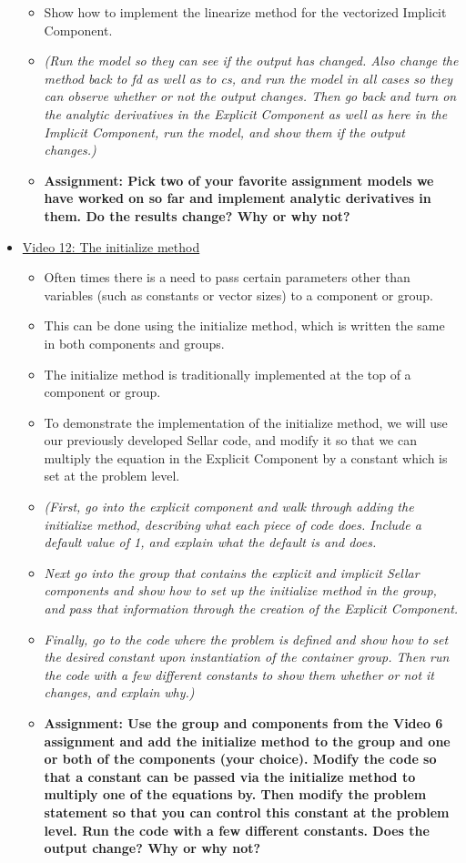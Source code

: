 \documentclass[12pt, letterpaper]{article}
\begin{document}
\begin{itemize}
\begin{itemize}
			\item Show how to implement the linearize method for the vectorized Implicit Component.
			\item \textit{(Run the model so they can see if the output has changed. Also change the method back to fd as well as to cs, and run the model in all cases so they can observe whether or not the output changes. Then go back and turn on the analytic derivatives in the Explicit Component as well as here in the Implicit Component, run the model, and show them if the output changes.)}
			\item \textbf{Assignment: Pick two of your favorite assignment models we have worked on so far and implement analytic derivatives in them. Do the results change? Why or why not?}
		\end{itemize}
	\item \underline{Video 12: The initialize method}
		\begin{itemize}
			\item Often times there is a need to pass certain parameters other than variables (such as constants or vector sizes) to a component or group.
			\item This can be done using the initialize method, which is written the same in both components and groups.
			\item The initialize method is traditionally implemented at the top of a component or group.
			\item To demonstrate the implementation of the initialize method, we will use our previously developed Sellar code, and modify it so that we can multiply the equation in the Explicit Component by a constant which is set at the problem level. 
			\item \textit{(First, go into the explicit component and walk through adding the initialize method, describing what each piece of code does. Include a default value of 1, and explain what the default is and does.} 
			\item \textit{Next go into the group that contains the explicit and implicit Sellar components and show how to set up the initialize method in the group, and pass that information through the creation of the Explicit Component.}
			\item \textit{Finally, go to the code where the problem is defined and show how to set the desired constant upon instantiation of the container group. Then run the code with a few different constants to show them whether or not it changes, and explain why.)}
			\item \textbf{Assignment: Use the group and components from the Video 6 assignment and add the initialize method to the group and one or both of the components (your choice). Modify the code so that a constant can be passed via the initialize method to multiply one of the equations by. Then modify the problem statement so that you can control this constant at the problem level. Run the code with a few different constants. Does the output change? Why or why not?}

\end{itemize}
\end{itemize}
\end{document}
